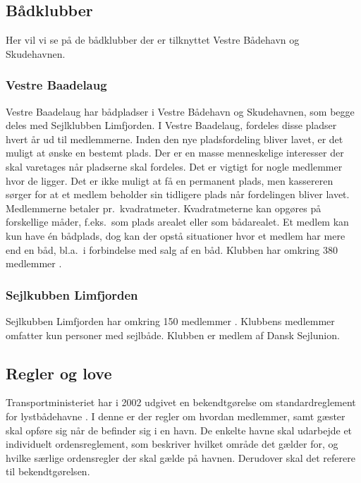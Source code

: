 \subsection{Bådklubber}
Her vil vi se på de bådklubber der er tilknyttet Vestre Bådehavn og Skudehavnen.

\subsubsection{Vestre Baadelaug}
Vestre Baadelaug har bådpladser i Vestre Bådehavn og Skudehavnen, som begge deles med Sejlklubben Limfjorden. I Vestre Baadelaug, fordeles disse pladser hvert år ud til medlemmerne. Inden den nye pladsfordeling bliver lavet, er det muligt at ønske en bestemt plads. Der er en masse menneskelige interesser der skal varetages når pladserne skal fordeles. Det er vigtigt for nogle medlemmer hvor de ligger. Det er ikke muligt at få en permanent plads, men kassereren sørger for at et medlem beholder sin tidligere plads når fordelingen bliver lavet. Medlemmerne betaler pr.\ kvadratmeter. Kvadratmeterne kan opgøres på forskellige måder, f.eks.\ som plads arealet eller som bådarealet. Et medlem kan kun have én bådplads, dog kan der opstå situationer hvor et medlem har mere end en båd, bl.a.\ i forbindelse med salg af en båd. Klubben har omkring 380 medlemmer \cite{int_vb_sl}.


\subsubsection{Sejlkubben Limfjorden}
Sejlkubben Limfjorden har omkring 150 medlemmer \cite{int_vb_sl}. Klubbens medlemmer omfatter kun personer med sejlbåde. Klubben er medlem af Dansk Sejlunion.


\subsection{Regler og love}
Transportministeriet har i 2002 udgivet en bekendtgørelse om standardreglement for lystbådehavne \cite{standardreglement}. I denne er der regler om hvordan medlemmer, samt gæster skal opføre sig når de befinder sig i en havn. De enkelte havne skal udarbejde et individuelt ordensreglement, som beskriver hvilket område det gælder for, og hvilke særlige ordensregler der skal gælde på havnen. Derudover skal det referere til bekendtgørelsen.

